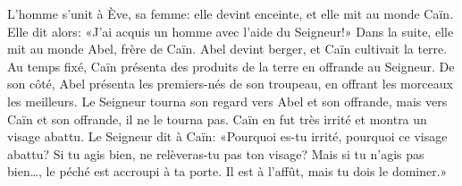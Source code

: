L’homme s’unit à Ève, sa femme:
	elle devint enceinte, et elle mit au monde Caïn.
Elle dit alors: «J’ai acquis un homme avec l’aide du Seigneur!»
Dans la suite, elle mit au monde Abel, frère de Caïn.
	Abel devint berger, et Caïn cultivait la terre.
Au temps fixé, Caïn présenta des produits de la terre en offrande au Seigneur.
De son côté, Abel présenta les premiers-nés de son troupeau,
	en offrant les morceaux les meilleurs.
Le Seigneur tourna son regard vers Abel et son offrande,
	mais vers Caïn et son offrande, il ne le tourna pas.
	Caïn en fut très irrité et montra un visage abattu.
Le Seigneur dit à Caïn: «Pourquoi es-tu irrité, pourquoi ce visage abattu?
	Si tu agis bien, ne relèveras-tu pas ton visage?
	Mais si tu n’agis pas bien…, le péché est accroupi à ta porte.
	Il est à l’affût, mais tu dois le dominer.»
